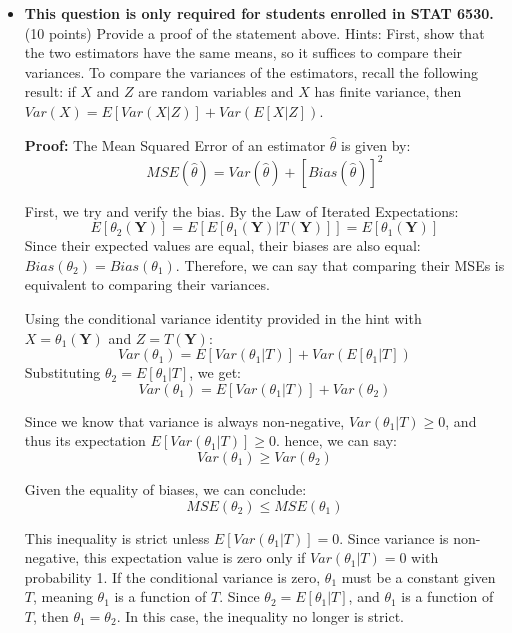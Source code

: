 \documentclass[12pt,letterpaper]{article}
\begin{document}
\begin{enumerate}[leftmargin=*]
\begin{itemize}
    \item[(b)] \textbf{This question is only required for students enrolled in STAT 6530.} (10 points) Provide a proof of the statement above. Hints: First, show that the two estimators have the same means, so it suffices to compare their variances. To compare the variances of the estimators, recall the following result: if $X$ and $Z$ are random variables and $X$ has finite variance, then $Var(X) = E[Var(X|Z)] + Var(E[X|Z])$.
    
    \textbf{Proof:}
    The Mean Squared Error of an estimator $\hat{\theta}$ is given by:
    \[ MSE(\hat{\theta}) = Var(\hat{\theta}) + [Bias(\hat{\theta})]^2 \]
    
    First, we try and verify the bias. By the Law of Iterated Expectations:
    \[ E[\theta_2(\textbf{Y})] = E[E[\theta_1(\textbf{Y}) | T(\textbf{Y})]] = E[\theta_1(\textbf{Y})] \]
    Since their expected values are equal, their biases are also equal: $Bias(\theta_2) = Bias(\theta_1)$. Therefore, we can say that comparing their MSEs is equivalent to comparing their variances.
    
    Using the conditional variance identity provided in the hint with $X = \theta_1(\textbf{Y})$ and $Z = T(\textbf{Y})$:
    \[ Var(\theta_1) = E[Var(\theta_1 | T)] + Var(E[\theta_1 | T]) \]
    Substituting $\theta_2 = E[\theta_1 | T]$, we get:
    \[ Var(\theta_1) = E[Var(\theta_1 | T)] + Var(\theta_2) \]
    
    Since we know that variance is always non-negative, $Var(\theta_1 | T) \ge 0$, and thus its expectation $E[Var(\theta_1 | T)] \ge 0$.
    hence, we can say:
    \[ Var(\theta_1) \ge Var(\theta_2) \]
    
    Given the equality of biases, we can conclude:
    \[ MSE(\theta_2) \le MSE(\theta_1) \]
    
    This inequality is strict unless $E[Var(\theta_1 | T)] = 0$. Since variance is non-negative, this expectation value is zero only if $Var(\theta_1 | T) = 0$ with probability 1. If the conditional variance is zero, $\theta_1$ must be a constant given $T$, meaning $\theta_1$ is a function of $T$. Since $\theta_2 = E[\theta_1|T]$, and $\theta_1$ is a function of $T$, then $\theta_1 = \theta_2$. In this case, the inequality no longer is strict. 
    
\end{itemize} 


\end{enumerate} 
\end{document}
